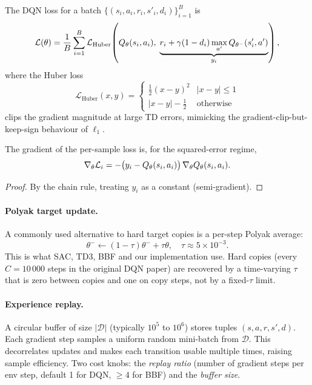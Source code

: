 \documentclass[11pt,oneside]{scrbook}
\begin{document}
The DQN loss for a batch $\{(s_i, a_i, r_i, s'_i, d_i)\}_{i=1}^B$ is
\begin{equation}
  \mathcal{L}(\theta) = \frac{1}{B}\sum_{i=1}^B \mathcal{L}_{\text{Huber}}\!\left(
    Q_\theta(s_i, a_i),\;
    \underbrace{r_i + \gamma (1-d_i)\max_{a'} Q_{\theta^-}(s'_i, a')}_{y_i}
  \right),
  \label{eq:dqn-loss}
\end{equation}
where the Huber loss
\[
  \mathcal{L}_{\text{Huber}}(x, y) = \begin{cases} \tfrac{1}{2}(x-y)^2 & |x-y| \le 1 \\ |x-y| - \tfrac{1}{2} & \text{otherwise}\end{cases}
\]
clips the gradient magnitude at large TD errors, mimicking the gradient-clip-but-keep-sign
behaviour of $\ell_1$.

\begin{theorem}
The gradient of the per-sample loss is, for the squared-error regime,
\[
  \nabla_\theta \mathcal{L}_i = -\bigl(y_i - Q_\theta(s_i, a_i)\bigr)\,\nabla_\theta Q_\theta(s_i, a_i).
\]
\end{theorem}

\begin{proof}
By the chain rule, treating $y_i$ as a constant (semi-gradient).
\end{proof}

\paragraph{Polyak target update.} A commonly used alternative to
hard target copies is a per-step Polyak average:
\[
  \theta^- \leftarrow (1 - \tau) \theta^- + \tau \theta, \quad \tau \approx 5\times 10^{-3}.
\]
This is what SAC, TD3, BBF and our implementation use. Hard copies (every $C=10\,000$
steps in the original DQN paper) are recovered by a time-varying $\tau$
that is zero between copies and one on copy steps, not by a fixed-$\tau$ limit.

\paragraph{Experience replay.} A circular buffer of size $|\mathcal{D}|$ (typically $10^5$
to $10^6$) stores tuples $(s, a, r, s', d)$. Each gradient step samples a uniform random
mini-batch from $\mathcal{D}$. This decorrelates updates and makes each transition usable
multiple times, raising sample efficiency. Two cost knobs: the \emph{replay ratio} (number
of gradient steps per env step, default 1 for DQN, $\ge 4$ for BBF) and the \emph{buffer
size}.
\end{document}
